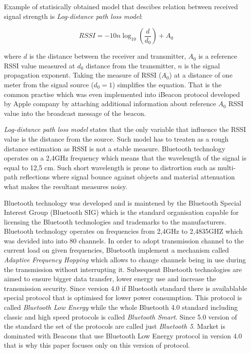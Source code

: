 \documentclass[../main.tex]{subfiles}
\begin{document}
Example of statisically obtained model that descibes relation between received signal strength is \textit{Log-distance path loss model}:

\begin{equation}
\label{eq:log-distance-model}
	RSSI = -10 n \log_{10} (\frac{d}{d_0}) + A_0
\end{equation}



where $ d $ is the distance between the receiver and transmitter, $A_0$ is a reference RSSI value measured at $d_0$ distance from the transmitter, $n$ is the signal propagation exponent. Taking the measure of RSSI ($A_0$) at a distance of one meter from the signal source ($d_0 = 1$) simplifies the equation. That is the common practise which was even implemented into iBeacon protocol developed by Apple company by attaching additional information about reference $A_0$ RSSI value into the broadcast message of the beacon.

\textit{Log-distance path loss model} states that the only variable that influence the RSSI value is the distance from the source. Such model has to treaten as a rough distance estimation as RSSI is not a stable measure. Bluetooth technology operates on a 2,4GHz frequency which means that the wavelength of the signal is equal to 12,5 cm. Such short wavelength is prone to distrortion such as multi-path reflections where signal bounce against objects and material attenuation what makes the resultant measures noisy.

Bluetooth technology was developed and is maintened by the Bluetooth Special Interest Group (Bluetooth SIG) which is the standard organisation capable for licensing the Bluetooth technologies and trademarks to the manufacturers. Bluetooth technology operates on frequencies from 2,4GHz to 2,4835GHZ which was devided into into 80 channels. In order to adopt transmission channel to the current load on given frequencies, Bluetooth implement a mechanism called \textit{Adaptive Frequency Hopping} which allows to change channels being in use during the transmission without interrupting it. Subsequent Bluetooth technologies are aimed to ensure bigger data transfer, lower energy use and increase the transmission security. Since version 4.0 if Bluetooth standard there is availablable special protocol that is optimised for lower power consumption. This protocol is called \textit{Bluetooth Low Energy} while the whole Bluetooth 4.0 standard including classic and high speed protocols is called \textit{Bluetooth Smart}. Since 5.0 version of the standard the set of the protocols are called just \textit{Bluetooth 5}. Market is dominated with Beacons that use Bluetooth Low Energy protocol in version 4.0 that is why this paper focuses only on this version of protocol.
\end{document}
